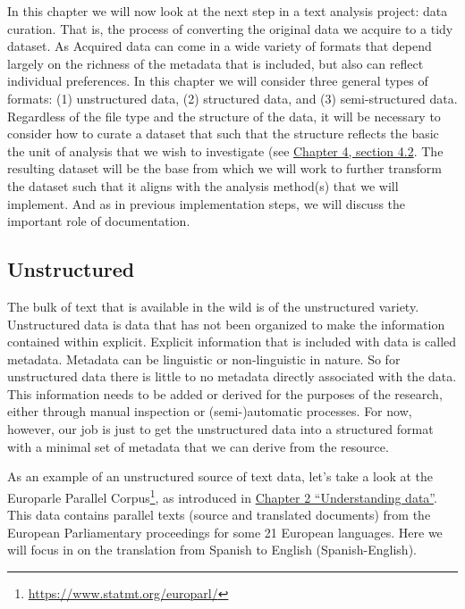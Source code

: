 \documentclass[
]{article}
\DeclareRobustCommand{\href}[2]{#2\footnote{\url{#1}}}
\begin{document}
In this chapter we will now look at the next step in a text analysis project: data curation. That is, the process of converting the original data we acquire to a tidy dataset. As Acquired data can come in a wide variety of formats that depend largely on the richness of the metadata that is included, but also can reflect individual preferences. In this chapter we will consider three general types of formats: (1) unstructured data, (2) structured data, and (3) semi-structured data. Regardless of the file type and the structure of the data, it will be necessary to consider how to curate a dataset that such that the structure reflects the basic the unit of analysis that we wish to investigate (see \protect\hyperlink{framing-research.htmlux5cux23research-question}{Chapter 4, section 4.2}. The resulting dataset will be the base from which we will work to further transform the dataset such that it aligns with the analysis method(s) that we will implement. And as in previous implementation steps, we will discuss the important role of documentation.

\hypertarget{unstructured}{%
\subsection{Unstructured}\label{unstructured}}

The bulk of text that is available in the wild is of the unstructured variety. Unstructured data is data that has not been organized to make the information contained within explicit. Explicit information that is included with data is called metadata. Metadata can be linguistic or non-linguistic in nature. So for unstructured data there is little to no metadata directly associated with the data. This information needs to be added or derived for the purposes of the research, either through manual inspection or (semi-)automatic processes. For now, however, our job is just to get the unstructured data into a structured format with a minimal set of metadata that we can derive from the resource.

As an example of an unstructured source of text data, let's take a look at the \href{https://www.statmt.org/europarl/}{Europarle Parallel Corpus}, as introduced in \protect\hyperlink{understanding-data}{Chapter 2 ``Understanding data''}. This data contains parallel texts (source and translated documents) from the European Parliamentary proceedings for some 21 European languages. Here we will focus in on the translation from Spanish to English (Spanish-English).
\end{document}
